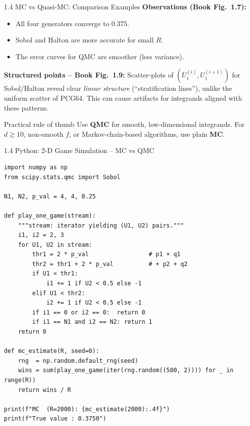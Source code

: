 \documentclass[aspectratio=169,10pt]{beamer}
\begin{document}
\begin{frame}[allowframebreaks]{1.4 MC vs Quasi-MC: Comparison Examples}
  \textbf{Observations (Book Fig.~1.7):}
  \begin{itemize}
    \item All four generators converge to $0.375$.
    \item Sobol and Halton are more accurate for small $R$.
    \item The error curves for QMC are smoother (less variance).
  \end{itemize}

  \textbf{Structured points -- Book Fig.~1.9:}
  Scatter-plots of $(U_1^{(i)}, U_1^{(i+1)})$ for Sobol/Halton reveal
  clear \emph{linear structure} (``stratification lines''), unlike the
  uniform scatter of PCG64. This can cause artifacts for integrands
  aligned with these patterns.

  \begin{alertblock}{Practical rule of thumb}
    Use \textbf{QMC} for smooth, low-dimensional integrands.
    For $d \gtrsim 10$, non-smooth $f$, or Markov-chain-based algorithms,
    use plain \textbf{MC}.
  \end{alertblock}

\end{frame}

\begin{frame}[fragile]{1.4 Python: 2-D Game Simulation -- MC vs QMC}

\begin{lstlisting}[style=python, caption={Winning probability: MC vs Sobol estimation}]
import numpy as np
from scipy.stats.qmc import Sobol

N1, N2, p_val = 4, 4, 0.25

def play_one_game(stream):
    """stream: iterator yielding (U1, U2) pairs."""
    i1, i2 = 2, 3
    for U1, U2 in stream:
        thr1 = 2 * p_val                 # p1 + q1
        thr2 = thr1 + 2 * p_val          # + p2 + q2
        if U1 < thr1:
            i1 += 1 if U2 < 0.5 else -1
        elif U1 < thr2:
            i2 += 1 if U2 < 0.5 else -1
        if i1 == 0 or i2 == 0:  return 0
        if i1 == N1 and i2 == N2: return 1
    return 0

def mc_estimate(R, seed=0):
    rng  = np.random.default_rng(seed)
    wins = sum(play_one_game(iter(rng.random((500, 2)))) for _ in range(R))
    return wins / R

print(f"MC  (R=2000): {mc_estimate(2000):.4f}")
print(f"True value : 0.3750")
\end{lstlisting}

\end{frame}
\end{document}
